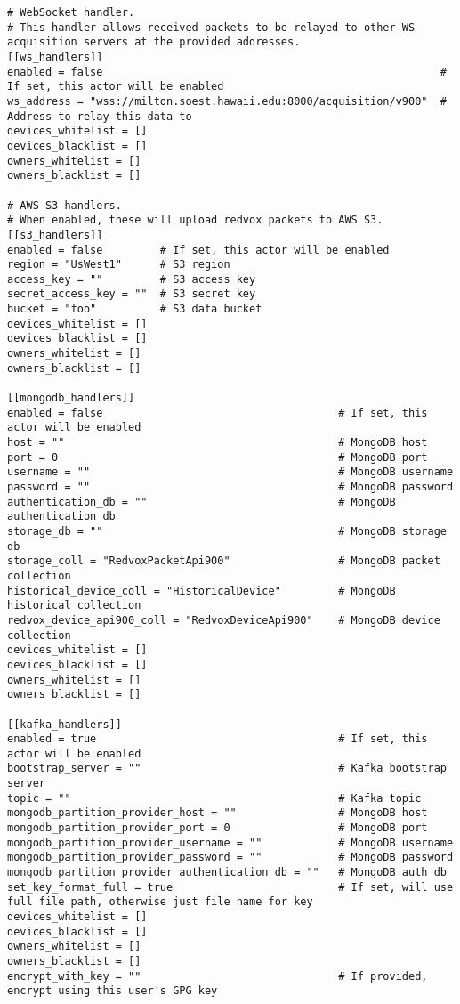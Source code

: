 \begin{lstlisting}
# WebSocket handler.
# This handler allows received packets to be relayed to other WS acquisition servers at the provided addresses.
[[ws_handlers]]
enabled = false                                                     # If set, this actor will be enabled
ws_address = "wss://milton.soest.hawaii.edu:8000/acquisition/v900"  # Address to relay this data to
devices_whitelist = []
devices_blacklist = []
owners_whitelist = []
owners_blacklist = []

# AWS S3 handlers.
# When enabled, these will upload redvox packets to AWS S3.
[[s3_handlers]]
enabled = false         # If set, this actor will be enabled
region = "UsWest1"      # S3 region
access_key = ""         # S3 access key
secret_access_key = ""  # S3 secret key
bucket = "foo"          # S3 data bucket
devices_whitelist = []
devices_blacklist = []
owners_whitelist = []
owners_blacklist = []

[[mongodb_handlers]]
enabled = false                                     # If set, this actor will be enabled
host = ""                                           # MongoDB host
port = 0                                            # MongoDB port
username = ""                                       # MongoDB username
password = ""                                       # MongoDB password
authentication_db = ""                              # MongoDB authentication db
storage_db = ""                                     # MongoDB storage db
storage_coll = "RedvoxPacketApi900"                 # MongoDB packet collection
historical_device_coll = "HistoricalDevice"         # MongoDB historical collection
redvox_device_api900_coll = "RedvoxDeviceApi900"    # MongoDB device collection
devices_whitelist = []
devices_blacklist = []
owners_whitelist = []
owners_blacklist = []

[[kafka_handlers]]
enabled = true                                      # If set, this actor will be enabled
bootstrap_server = ""                               # Kafka bootstrap server
topic = ""                                          # Kafka topic
mongodb_partition_provider_host = ""                # MongoDB host
mongodb_partition_provider_port = 0                 # MongoDB port
mongodb_partition_provider_username = ""            # MongoDB username
mongodb_partition_provider_password = ""            # MongoDB password
mongodb_partition_provider_authentication_db = ""   # MongoDB auth db
set_key_format_full = true                          # If set, will use full file path, otherwise just file name for key
devices_whitelist = []
devices_blacklist = []
owners_whitelist = []
owners_blacklist = []
encrypt_with_key = ""                               # If provided, encrypt using this user's GPG key
\end{lstlisting}

